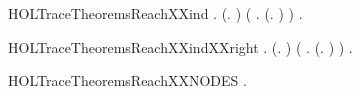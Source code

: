 \newcommand{\HOLTraceTheoremsReachXXcasesTwo}{\UseVerbatim{HOLTraceTheoremsReachXXcasesTwo}}
\begin{SaveVerbatim}{HOLTraceTheoremsReachXXind}
\HOLTokenTurnstile{} \HOLSymConst{\HOLTokenForall{}}.
       (\HOLSymConst{\HOLTokenForall{}}.   ) \HOLSymConst{\HOLTokenConj{}} (\HOLSymConst{\HOLTokenForall{}}  . (\HOLSymConst{\HOLTokenExists{}}.  \HOLTokenTransBegin{}\HOLTokenTransEnd {}) \HOLSymConst{\HOLTokenConj{}}    \HOLSymConst{\HOLTokenImp{}}   ) \HOLSymConst{\HOLTokenImp{}}
       \HOLSymConst{\HOLTokenForall{}} .    \HOLSymConst{\HOLTokenImp{}}   
\end{SaveVerbatim}
\newcommand{\HOLTraceTheoremsReachXXind}{\UseVerbatim{HOLTraceTheoremsReachXXind}}
\begin{SaveVerbatim}{HOLTraceTheoremsReachXXindXXright}
\HOLTokenTurnstile{} \HOLSymConst{\HOLTokenForall{}}.
       (\HOLSymConst{\HOLTokenForall{}}.   ) \HOLSymConst{\HOLTokenConj{}} (\HOLSymConst{\HOLTokenForall{}}  .    \HOLSymConst{\HOLTokenConj{}} (\HOLSymConst{\HOLTokenExists{}}.  \HOLTokenTransBegin{}\HOLTokenTransEnd {}) \HOLSymConst{\HOLTokenImp{}}   ) \HOLSymConst{\HOLTokenImp{}}
       \HOLSymConst{\HOLTokenForall{}} .    \HOLSymConst{\HOLTokenImp{}}   
\end{SaveVerbatim}
\newcommand{\HOLTraceTheoremsReachXXindXXright}{\UseVerbatim{HOLTraceTheoremsReachXXindXXright}}
\begin{SaveVerbatim}{HOLTraceTheoremsReachXXNODES}
\HOLTokenTurnstile{} \HOLSymConst{\HOLTokenForall{}} .    \HOLSymConst{\HOLTokenImp{}}  \HOLConst{\HOLTokenIn{}}  
\end{SaveVerbatim}
\newcommand{\HOLTraceTheoremsReachXXNODES}{\UseVerbatim{HOLTraceTheoremsReachXXNODES}}
